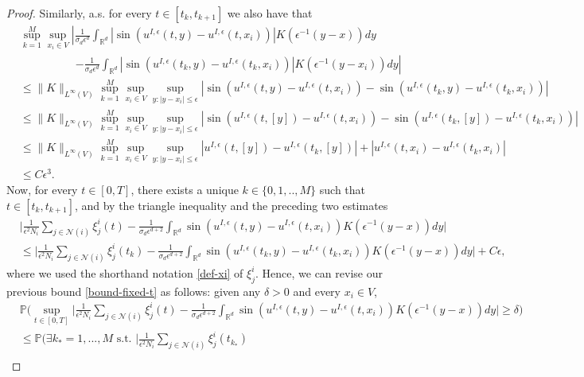 \documentclass[a4paper,11pt]{amsart}
\newcommand{\red}[1]{{#1}}
\renewcommand{\P}{\mathbb{P}}
\newcommand{\R}{\mathbb{R}}
\newcommand{\ep}{\epsilon}
\newcommand{\cN}{\mathcal{N}}
\numberwithin{equation}{section}
\numberwithin{theorem}{section}
\theoremstyle{definition}
\begin{document}
\begin{proof}
Similarly, a.s. for every $t\in[t_k, t_{k+1}]$ we also have that 
\begin{align*}
&\sup_{k=1}^M\sup_{x_i\in V}\left|\displaystyle{\frac{1}{\sigma_d\ep^d}}\int_{\R^d}\left|\sin\left(u^{I,\ep}(t,y)-u^{I,\ep}(t,x_i)\right)\right|K\left(\ep^{-1}(y-x)\right)dy \right. \\
&\qquad\quad\quad\quad \left.-\displaystyle{\frac{1}{\sigma_d\ep^d}}\int_{\R^d}\left|\sin\left(u^{I,\ep}(t_k,y)-u^{I,\ep}(t_k,x_i)\right)\right|K\left(\ep^{-1}(y-x_i)\right)dy \right|\\
&\le \|K\|_{L^\infty(V)}\sup_{k=1}^M\sup_{x_i\in V}\sup_{y: |y-x_i|\le\ep}\left|\sin\left(u^{I,\ep}(t,y)-u^{I,\ep}(t,x_i)\right)-\sin\left(u^{I,\ep}(t_{k},y)-u^{I,\ep}(t_{k},x_i)\right)\right|\\
&\le \red{\|K\|_{L^\infty(V)}\sup_{k=1}^M\sup_{x_i\in V}\sup_{y: |y-x_i|\le\ep}\left|\sin\left(u^{I,\ep}(t,[y])-u^{I,\ep}(t,x_i)\right)-\sin\left(u^{I,\ep}(t_{k},[y])-u^{I,\ep}(t_{k},x_i)\right)\right|}\\
&\le \red{\|K\|_{L^\infty(V)}\sup_{k=1}^M\sup_{x_i\in V}\sup_{y: |y-x_i|\le\ep}|u^{I,\ep}(t,[y])-u^{I,\ep}(t_k,[y])|+|u^{I,\ep}(t,x_i)-u^{I,\ep}(t_k,x_i)|}\\
&\le C\ep^3.
\end{align*}
Now, for every $t\in [0,T]$, there exists a unique $k\in\{0,1,..,M\}$ such that $t\in[t_k,t_{k+1}]$, and by the triangle inequality and the preceding two estimates
\begin{align*}
&\Big|\frac{1}{\ep^2N_i}\sum_{j\in\cN(i)}\xi_j^i(t)- \frac{1}{\sigma_d\ep^{d+2}}\int_{\red{\mathbb{R}^d}} \sin\left(u^{I,\ep}(t,y)-u^{I,\ep}(t,x_i)\right)K\left(\ep^{-1}(y-x)\right)dy \Big|\\
& \le\Big|\frac{1}{\ep^2N_i}\sum_{j\in\cN(i)}\xi_j^i(t_k) -\frac{1}{\sigma_d\ep^{d+2}}\int_{\red{\mathbb{R}^d}} \sin\left(u^{I,\ep}(t_k,y)-u^{I,\ep}(t_k,x_i)\right)K\left(\ep^{-1}(y-x)\right)dy \Big| +C\ep,
\end{align*}
where we used the shorthand notation \eqref{def-xi} of $\xi_j^i$. 
Hence, we can revise our previous bound \eqref{bound-fixed-t} as follows: given any $\delta>0$ and every $x_i\in V$,
\begin{align*}
&\P\Big(\sup_{t\in[0,T]}\Big|\frac{1}{\ep^2N_i}\sum_{j\in\cN(i)}\xi_j^i(t)-\frac{1}{\sigma_d\ep^{d+2}}\int_{\red{\mathbb{R}^d}} \sin\left(u^{I,\ep}(t,y)-u^{I,\ep}(t,x_i)\right)K\left(\ep^{-1}(y-x)\right)dy \Big|\ge \delta\Big)\\
&\le \P\Big(\exists k_*=1,...,M \text{ s.t. }\Big|\frac{1}{\ep^2N_i}\sum_{j\in\cN(i)}\xi_j^i(t_{k_*})\\

\end{align*}
\end{proof}
\end{document}

